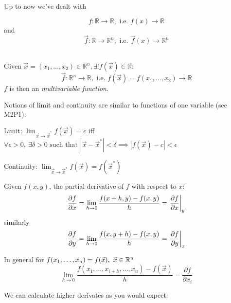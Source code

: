 \documentclass[twoside]{scrartcl}
\begin{document}



\setcounter{lecture}{2}

\pagebreak
{}



Up to now we've dealt with 

\[f: \mathbb{R} \to \mathbb{R}, \text{ i.e. } f(x) \to \mathbb{R}\]
and 
\[\vec{f}: \mathbb{R} \to \mathbb{R}^n, \text{ i.e. } \vec{f}(x) \to \mathbb{R}^n\]~

\begin{definition}
Given $\vec{x} = (x_1,\dots,x_2) \in \mathbb{R}^n, \exists! f(\vec{x}) \in \mathbb{R}$: 
\[\vec{f}: \mathbb{R}^n \to \mathbb{R}, \text{ i.e. } f(\vec{x}) = f(x_1,\dots,x_2) \to \mathbb{R}\]	
$f$ is then an \emph{multivariable function.} 
\end{definition}

\pagebreak


Notions of limit and continuity are similar to functions of one variable (see M2P1):

Limit: $\lim_{{\vec{x}}\to{\vec{x}^*}} f(\vec{x}) = c$ iff $\forall \epsilon >0,~\exists \delta > 0 \text{ such that } |\vec{x} - \vec{x}^*| < \delta \implies |f(\vec{x}) - c| < \epsilon$

Continuity: $\lim_{{\vec{x}}\to{\vec{x}^*}} f(\vec{x}) = f(\vec{x}^*)$\\

\begin{definition}
Given $f(x,y)$, the partial derivative of $f$ with respect to $x$: 
\[\frac{\partial f}{\partial x} = \lim_{h\to0}\frac{f(x+h,y) - f(x,y)}{h} = \left.\frac{\partial f}{\partial x}\right|_y\]
similarly 
\[\frac{\partial f}{\partial y} = \lim_{h\to0}\frac{f(x,y+h) - f(x,y)}{h} = \left.\frac{\partial f}{\partial y}\right|_x\]

In general for $f(x_1,\dots,x_n) = f(\vec{x}),~\vec{x} \in\mathbb{R}^n$
\[\lim_{h\to0}\frac{f(x_1,\dots,x_{i+h},\dots,x_n) - f(\vec{x})}{h} = \frac{\partial f}{\partial x_i}\]
\end{definition}

We can calculate higher derivates as you would expect: 
\end{document}
